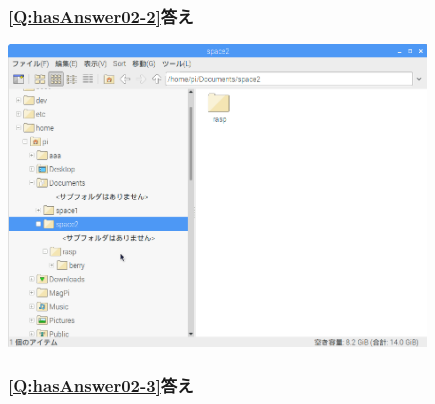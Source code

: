 \documentclass[a4paper,12pt]{jarticle}
\begin{document}
\bigskip


\bigskip


\bigskip

\subsubsection{\bfseries
\ref*{Q:hasAnswer02-2}答え}

\bigskip



\centering
\includegraphics[width=11.081cm,height=8.008cm]{textbook-img213.png}
\flushleft

\clearpage\subsubsection{\bfseries
\ref*{Q:hasAnswer02-3}答え}
\end{document}
